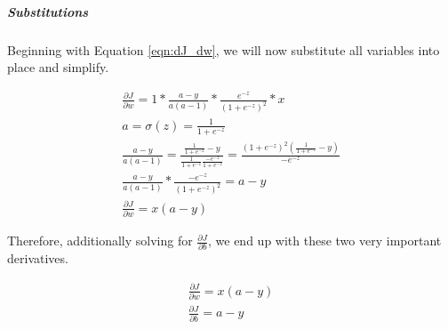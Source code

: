 \documentclass{article}
\newcommand{\mysubparagraph}[1]{\subparagraph{#1}\mbox{}}
\begin{document}
\mysubparagraph{Substitutions}

Beginning with Equation \ref{eqn:dJ_dw}, we will now substitute all variables into place and simplify.

\begin{gather}
\frac{\partial{J}}{\partial{w}} = 1 * \frac{a-y}{a(a-1)} * \frac{e^{-z}}{(1+e^{-z})^{2}} * x \\
%
a = \sigma(z) = \frac{1}{1 + e^{-z}} \\
%
\frac{a-y}{a(a-1)} = \frac{\frac{1}{1 + e^{-z}} - y}{\frac{1}{1 + e^{-z}} \frac{-e^{-z}}{1 + e^{-z}}} = \frac{(1+e^{-z})^2 (\frac{1}{1 + e^{-z}} - y)}{-e^{-z}} \\
%
\frac{a-y}{a(a-1)} * \frac{-e^{-z}}{(1+e^{-z})^{2}} = a-y \\
%
\frac{\partial{J}}{\partial{w}} = x(a-y)
\end{gather}

Therefore, additionally solving for $\frac{\partial{J}}{\partial{b}}$, we end up with these two very important derivatives.

\begin{gather}
\frac{\partial{J}}{\partial{w}} = x(a-y) \\
%
\frac{\partial{J}}{\partial{b}} = a-y
\end{gather}
\end{document}
